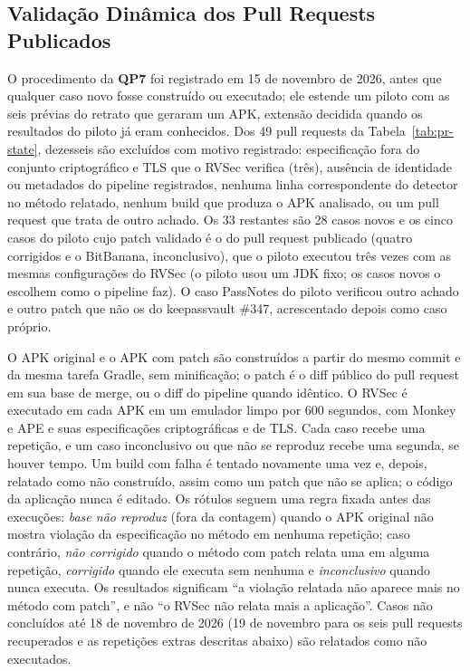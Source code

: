 \documentclass[conference]{IEEEtran}
\newcommand{\researchq}[1]{\textbf{QP#1}}
\begin{document}
\subsection{Validação Dinâmica dos Pull Requests Publicados}
\label{subsec:dynval}

O procedimento da \researchq{7} foi registrado em 15 de novembro de 2026, antes que qualquer
caso novo fosse construído ou executado; ele estende um piloto com as seis prévias do retrato que geraram um APK, extensão
decidida quando os resultados do piloto já eram conhecidos. Dos 49 pull requests da
Tabela~\ref{tab:pr-state}, dezesseis são excluídos com motivo registrado:
especificação fora do conjunto criptográfico e TLS que o RVSec verifica (três), ausência de
identidade ou metadados do pipeline registrados, nenhuma linha correspondente do detector no
método relatado, nenhum build que produza o APK analisado, ou um pull request
que trata de outro achado. Os 33 restantes são 28 casos novos e os cinco
casos do piloto cujo patch validado é o do pull request publicado (quatro
corrigidos e o BitBanana, inconclusivo), que o piloto executou três vezes com
as mesmas configurações do RVSec (o piloto usou um JDK fixo; os casos novos o
escolhem como o pipeline faz). O caso PassNotes do piloto verificou outro achado
e outro patch que não os do keepassvault \#347, acrescentado depois como caso
próprio.

O APK original e o APK com patch são construídos a partir do mesmo commit e da mesma tarefa Gradle,
sem minificação; o patch é o diff público do pull request em sua
base de merge, ou o diff do pipeline quando idêntico. O RVSec é executado em cada APK em um
emulador limpo por 600 segundos, com Monkey e APE e suas especificações criptográficas e
de TLS. Cada caso recebe uma repetição, e um caso inconclusivo ou
que não se reproduz recebe uma segunda, se houver tempo. Um build com falha é tentado novamente
uma vez e, depois, relatado como não construído, assim como um patch que não se aplica; o
código da aplicação nunca é editado. Os rótulos seguem uma regra fixada antes das
execuções: \emph{base não reproduz} (fora da contagem) quando o APK original
não mostra violação da especificação no método em nenhuma repetição;
caso contrário, \emph{não corrigido} quando o método com patch relata uma em alguma
repetição, \emph{corrigido} quando ele executa sem nenhuma e
\emph{inconclusivo} quando nunca executa. Os resultados significam ``a violação
relatada não aparece mais no método com patch'', e não ``o RVSec não relata mais
a aplicação''. Casos não concluídos até 18 de novembro de 2026
(19 de novembro para os seis pull requests recuperados e as repetições extras
descritas abaixo) são relatados como não
executados.
\end{document}
